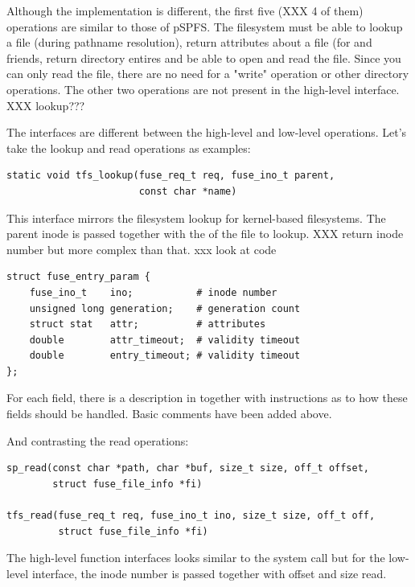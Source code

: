 \noindent
Although the implementation is different, the first five (XXX 4 of them) operations are similar to those of pSPFS. The filesystem must be able to lookup a file (during pathname resolution), return attributes about a file (for  and friends, return directory entires and be able to open and read the file. Since you can only read the file, there are no need for a "write" operation or other directory operations. The other two operations are not present in the high-level interface. XXX lookup???

The interfaces are different between the high-level and low-level operations. Let's take the lookup and read operations as examples:

\begin{lstlisting}
static void tfs_lookup(fuse_req_t req, fuse_ino_t parent,
                       const char *name)
\end{lstlisting}

\noindent
This interface mirrors the filesystem lookup for kernel-based filesystems. The parent inode is passed together with the  of the file to lookup. XXX return inode number but more complex than that. xxx look at code

\begin{lstlisting}
struct fuse_entry_param {
    fuse_ino_t    ino;           # inode number
    unsigned long generation;    # generation count
    struct stat   attr;          # attributes
    double        attr_timeout;  # validity timeout
    double        entry_timeout; # validity timeout
};
\end{lstlisting}

\noindent
For each field, there is a description in  together with instructions as to how these fields should be handled. Basic comments have been added above.

And contrasting the read operations:

\begin{lstlisting}
sp_read(const char *path, char *buf, size_t size, off_t offset,
        struct fuse_file_info *fi)

tfs_read(fuse_req_t req, fuse_ino_t ino, size_t size, off_t off, 
         struct fuse_file_info *fi)
\end{lstlisting}

\noindent
The high-level function interfaces looks similar to the  system call but for the low-level interface, the inode number is passed together with offset and size read.


